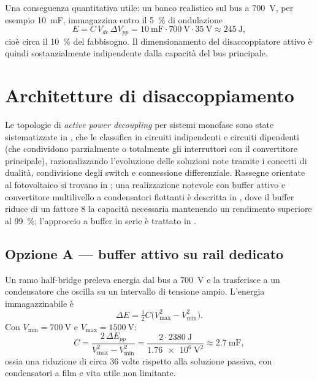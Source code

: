 Una conseguenza quantitativa utile: un banco realistico sul bus a \SI{700}{\volt}, per
esempio \SI{10}{\milli\farad}, immagazzina entro il \SI{5}{\percent} di ondulazione
\begin{equation}
E = C\,V_{dc}\,\Delta V_{pp} = \SI{10}{\milli\farad}\cdot\SI{700}{\volt}\cdot\SI{35}{\volt}
\approx \SI{245}{\joule},
\end{equation}
cioè circa il \SI{10}{\percent} del fabbisogno. Il dimensionamento del disaccoppiatore
attivo è quindi sostanzialmente indipendente dalla capacità del bus principale.

\section{Architetture di disaccoppiamento}

Le topologie di \emph{active power decoupling} per sistemi monofase sono state
sistematizzate in \cite{sun2016review}, che le classifica in circuiti indipendenti e
circuiti dipendenti (che condividono parzialmente o totalmente gli interruttori con il
convertitore principale), razionalizzando l'evoluzione delle soluzioni note tramite i
concetti di dualità, condivisione degli switch e connessione differenziale. Rassegne
orientate al fotovoltaico si trovano in \cite{hu2013review}; una realizzazione notevole
con buffer attivo e convertitore multilivello a condensatori flottanti è descritta in
\cite{lei2017fcml}, dove il buffer riduce di un fattore \num{8} la capacità necessaria
mantenendo un rendimento superiore al \SI{99}{\percent}; l'approccio a buffer in serie è
trattato in \cite{pierquet2013}.

\subsection{Opzione A --- buffer attivo su rail dedicato}

Un ramo half-bridge preleva energia dal bus a \SI{700}{\volt} e la trasferisce a un
condensatore che oscilla su un intervallo di tensione ampio. L'energia immagazzinabile è
\begin{equation}
\Delta E = \tfrac{1}{2}C\bigl(V_{\max}^2 - V_{\min}^2\bigr).
\end{equation}
Con $V_{\min}=\SI{700}{\volt}$ e $V_{\max}=\SI{1500}{\volt}$:
\begin{equation}
C = \frac{2\,\Delta E_{pp}}{V_{\max}^2-V_{\min}^2}
= \frac{2\cdot\SI{2380}{\joule}}{\SI{1.76e6}{\volt\squared}}
\approx \SI{2.7}{\milli\farad},
\end{equation}
ossia una riduzione di circa \num{36} volte rispetto alla soluzione passiva, con
condensatori a film e vita utile non limitante.

